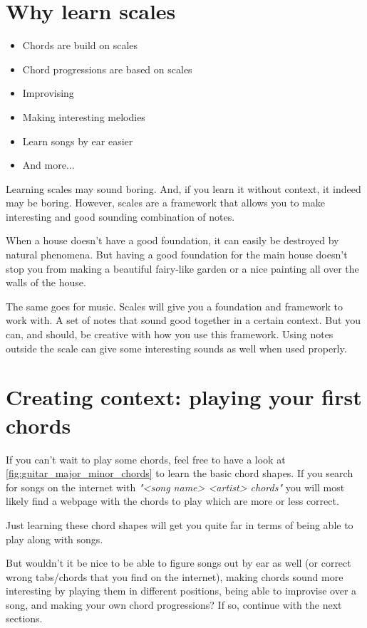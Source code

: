 \section{Why learn scales}

\begin{itemize}
	\item Chords are build on scales
	\item Chord progressions are based on scales
	\item Improvising
	\item Making interesting melodies
	\item Learn songs by ear easier
	\item And more...
\end{itemize}

Learning scales may sound boring. And, if you learn it without context, it indeed may be boring. However, scales are a framework that allows you to make interesting and good sounding combination of notes.

When a house doesn't have a good foundation, it can easily be destroyed by natural phenomena. But having a good foundation for the main house doesn't stop you from making a beautiful fairy-like garden or a nice painting all over the walls of the house.

The same goes for music. Scales will give you a foundation and framework to work with. A set of notes that sound good together in a certain context. But you can, and should, be creative with how you use this framework. Using notes outside the scale can give some interesting sounds as well when used properly.

\section{Creating context: playing your first chords}

If you can't wait to play some chords, feel free to have a look at \autoref{fig:guitar_major_minor_chords} to learn the basic chord shapes. If you search for songs on the internet with \textit{"<song name> <artist> chords"} you will most likely find a webpage with the chords to play which are more or less correct.

Just learning these chord shapes will get you quite far in terms of being able to play along with songs.

But wouldn't it be nice to be able to figure songs out by ear as well (or correct wrong tabs/chords that you find on the internet), making chords sound more interesting by playing them in different positions, being able to improvise over a song, and making your own chord progressions? If so, continue with the next sections.

